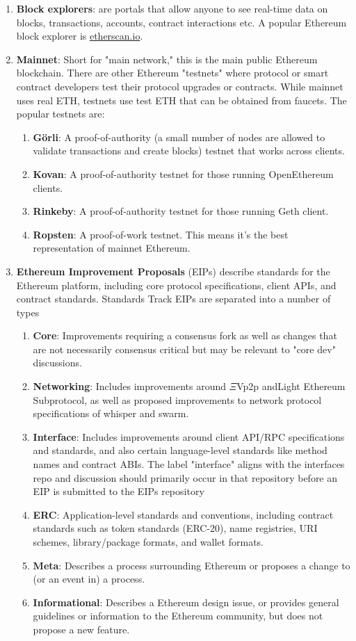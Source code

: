 \begin{enumerate}
\item\textbf{Block explorers}: are portals that allow anyone to see real-time data on blocks, transactions, accounts, contract interactions etc. A popular Ethereum block explorer is \url{etherscan.io}.

\item\textbf{Mainnet}: Short for "main network," this is the main public Ethereum blockchain. There are other Ethereum "testnets" where protocol or smart contract developers test their protocol upgrades or contracts. While mainnet uses real ETH, testnets use test ETH that can be obtained from faucets. The popular testnets are:
\begin{enumerate}
\item\textbf{G\"orli}: A proof-of-authority (a small number of nodes are allowed to validate transactions and create blocks) testnet that works across clients.
\item\textbf{Kovan}: A proof-of-authority testnet for those running OpenEthereum clients.
\item\textbf{Rinkeby}: A proof-of-authority testnet for those running Geth client.
\item\textbf{Ropsten}: A proof-of-work testnet. This means it's the best representation of mainnet Ethereum.
\end{enumerate}

\item\textbf{Ethereum Improvement Proposals} (EIPs) describe standards for the Ethereum platform, including core protocol specifications, client APIs, and contract standards. Standards Track EIPs are separated into a number of types
\begin{enumerate}
\item\textbf{Core}: Improvements requiring a consensus fork as well as changes that are not necessarily consensus critical but may be relevant to "core dev" discussions.
\item\textbf{Networking}:  Includes improvements around \DJ$\Xi$Vp2p and\linebreak Light Ethereum Subprotocol, as well as proposed improvements to network protocol specifications of whisper and swarm.
\item\textbf{Interface}: Includes improvements around client API/RPC specifications and standards, and also certain language-level standards like method names and contract ABIs. The label "interface" aligns with the interfaces repo and discussion should primarily occur in that repository before an EIP is submitted to the EIPs repository
\item\textbf{ERC}: Application-level standards and conventions, including contract standards such as token standards (ERC-20), name registries, URI schemes, library/package formats, and wallet formats.
\item\textbf{Meta}: Describes a process surrounding Ethereum or proposes a change to (or an event in) a process.
\item\textbf{Informational}: Describes a Ethereum design issue, or provides general guidelines or information to the Ethereum community, but does not propose a new feature.
\end{enumerate}


\end{enumerate}
